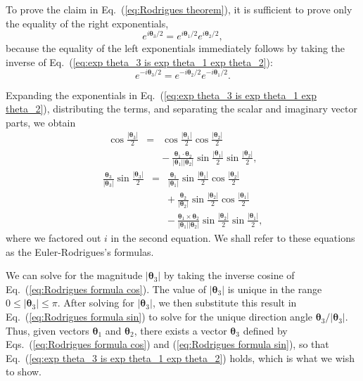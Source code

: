 \documentclass[11pt,twocolumn]{article}
\begin{document}
To prove the claim in Eq.~(\ref{eq:Rodrigues theorem}), it is sufficient to prove only the equality of the right exponentials,
\begin{equation}
\label{eq:exp theta_3 is exp theta_1 exp theta_2}
e^{i\bm\theta_3/2}=e^{i\bm\theta_1/2}e^{i\bm\theta_2/2},
\end{equation}
because the equality of the left exponentials immediately follows by taking the inverse of Eq.~(\ref{eq:exp theta_3 is exp theta_1 exp theta_2}):
\begin{equation}
\label{eq:exp -theta_3 is exp -theta_2 exp -theta_1}
e^{-i\bm\theta_3/2}=e^{-i\bm\theta_2/2}e^{-i\bm\theta_1/2}.
\end{equation}

Expanding the exponentials in Eq.~(\ref{eq:exp theta_3 is exp theta_1 exp theta_2}), distributing the terms, and separating the scalar and imaginary vector parts, we obtain 
\begin{eqnarray}
\label{eq:Rodrigues formula cos}
\cos\frac{|\bm\theta_3|}{2}&=&\cos\frac{|\bm\theta_1|}{2}\cos\frac{|\bm\theta_2|}{2}\nonumber\\
& &-\ \frac{\bm\theta_1\cdot\bm\theta_2} {|\bm\theta_1||\bm\theta_2|}\sin\frac{|\bm\theta_1|}{2}\sin\frac{|\bm\theta_2|}{2},
\end{eqnarray}
\begin{eqnarray}
\label{eq:Rodrigues formula sin}
\frac{\bm\theta_3}{|\bm\theta_3|}\sin\frac{|\bm\theta_3|}{2}&=&\frac{\bm\theta_1}{|\bm\theta_1|}\sin\frac{|\bm\theta_1|}{2}\cos\frac{|\bm\theta_2|}{2}\nonumber\\
& &+\ \frac{\bm\theta_2}{|\bm\theta_2|}\sin\frac{|\bm\theta_2|}{2}\cos\frac{|\bm\theta_1|}{2}\nonumber\\
& &-\ \frac{\bm\theta_1\times\bm\theta_2}{|\bm\theta_1||\bm\theta_2|}\sin\frac{|\bm\theta_2|}{2}\sin\frac{|\bm\theta_1|}{2},
\end{eqnarray}
where we factored out $i$ in the second equation.  We shall refer to these equations as the Euler-Rodrigues's formulas.\cite{Hestenes_1990_NewFoundationsforClassicalMechanics_pp282-284}\cite{Hladik_1999_SpinorsinPhysics_p15}

We can solve for the magnitude $|\bm\theta_3|$ by taking the inverse cosine of Eq.~(\ref{eq:Rodrigues formula cos}).  The value of $|\bm\theta_3|$ is unique in the range $0\leq|\bm\theta_3|\leq\pi$.  After solving for $|\bm\theta_3|$, we then substitute this result in Eq.~(\ref{eq:Rodrigues formula sin}) to solve for the unique direction angle $\bm\theta_3/|\bm\theta_3|$.  Thus, given vectors $\bm\theta_1$ and $\bm\theta_2$, there exists a vector $\bm\theta_3$ defined by Eqs.~(\ref{eq:Rodrigues formula cos}) and (\ref{eq:Rodrigues formula sin}), so that Eq.~(\ref{eq:exp theta_3 is exp theta_1 exp theta_2}) holds, which is what we wish to show.  
\end{document}
